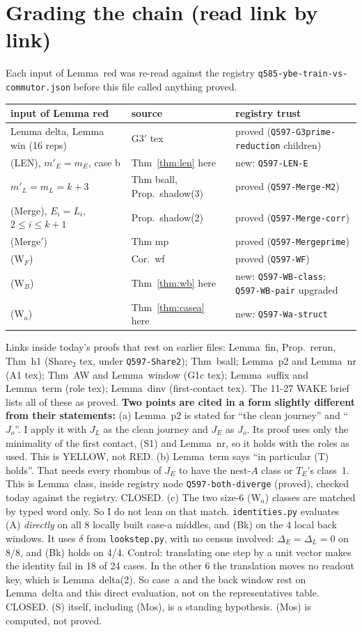 \documentclass[11pt]{article}
\theoremstyle{remark}\newtheorem{remark}[theorem]{Remark}
\begin{document}
\section{Grading the chain (read link by link)}
Each input of Lemma~red was re-read against the registry \texttt{q585-ybe-train-vs-commutor.json} before this file called anything proved.
\begin{center}\small\begin{tabular}{lll}\toprule
input of Lemma red & source & registry trust\\\midrule
Lemma delta, Lemma win (16 reps) & G3$'$ tex & proved (\texttt{Q597-G3prime-reduction} children)\\
(LEN), $m'_E=m_E$, case b & Thm~\ref{thm:len} here & new: \texttt{Q597-LEN-E}\\
$m'_L=m_L=k+3$ & Thm bsall, Prop.~shadow(3) & proved (\texttt{Q597-Merge-M2})\\
(Merge), $E_i=L_i$, $2\le i\le k+1$ & Prop.~shadow(2) & proved (\texttt{Q597-Merge-corr})\\
(Merge$'$) & Thm mp & proved (\texttt{Q597-Mergeprime})\\
(W$_F$) & Cor.~wf & proved (\texttt{Q597-WF})\\
(W$_B$) & Thm~\ref{thm:wb} here & new: \texttt{Q597-WB-class}; \texttt{Q597-WB-pair} upgraded\\
(W$_a$) & Thm~\ref{thm:casea} here & new: \texttt{Q597-Wa-struct}\\\bottomrule
\end{tabular}\end{center}
Links inside today's proofs that rest on earlier files: Lemma~fin, Prop.~rerun, Thm~h1 (Share$_2$ tex, under \texttt{Q597-Share2}); Thm~bsall; Lemma~p2 and Lemma~nr (A1 tex); Thm~AW and Lemma~window (G1c tex); Lemma~suffix and Lemma~term (role tex); Lemma~dinv (first-contact tex). The 11-27 WAKE brief lists all of these as proved. \textbf{Two points are cited in a form slightly different from their statements:}
(a) Lemma~p2 is stated for ``the clean journey'' and ``$J_o$''. I apply it with $J_L$ as the clean journey and $J_E$ as $J_o$. Its proof uses only the minimality of the first contact, (S1) and Lemma~nr, so it holds with the roles as used. This is YELLOW, not RED.
(b) Lemma~term says ``in particular (T) holds''. That needs every rhombus of $J_E$ to have the nest-$A$ class or $T_E$'s class~1. This is Lemma~class, inside registry node \texttt{Q597-both-diverge} (proved), checked today against the registry. CLOSED.
(c) The two size-6 (W$_a$) classes are matched by typed word only. So I do not lean on that match. \texttt{identities.py} evaluates (A) \emph{directly} on all 8 locally built case-a middles, and (Bk) on the 4 local back windows. It uses $\delta$ from \texttt{lookstep.py}, with no census involved: $\Delta_E=\Delta_L=0$ on 8/8, and (Bk) holds on 4/4. Control: translating one step by a unit vector makes the identity fail in 18 of 24 cases. In the other 6 the translation moves no readout key, which is Lemma~delta(2). So case~a and the back window rest on Lemma~delta and this direct evaluation, not on the representatives table. CLOSED.
(S) itself, including (Mos), is a standing hypothesis. (Mos) is computed, not proved.
\end{document}
